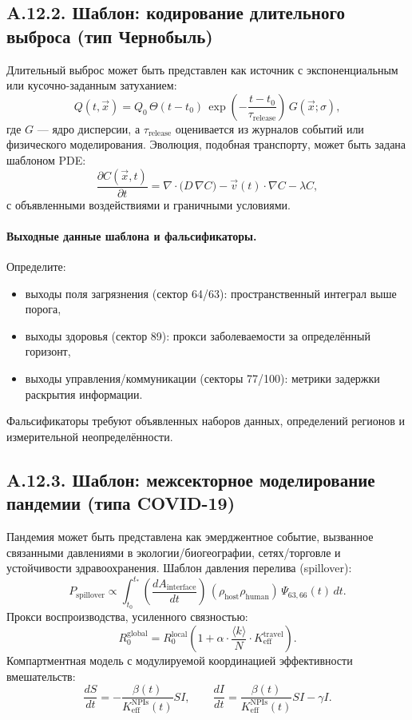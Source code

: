 \documentclass[11pt,a4paper]{article}
\begin{document}
	\subsection*{A.12.2. Шаблон: кодирование длительного выброса (тип Чернобыль)}
	
	Длительный выброс может быть представлен как источник с экспоненциальным или кусочно-заданным затуханием:
	$$
	Q(t,\vec{x}) = Q_0\,\Theta(t-t_0)\,\exp\!\left(-\frac{t-t_0}{\tau_{\mathrm{release}}}\right)\,G(\vec{x};\sigma),
	$$
	где $G$ — ядро дисперсии, а $\tau_{\mathrm{release}}$ оценивается из журналов событий или физического моделирования. Эволюция, подобная транспорту, может быть задана шаблоном PDE:
	$$
	\frac{\partial C(\vec{x},t)}{\partial t}
	= \nabla\cdot\big(D\,\nabla C\big) - \vec{v}(t)\cdot\nabla C - \lambda C,
	$$
	с объявленными воздействиями и граничными условиями.
	
	\paragraph{Выходные данные шаблона и фальсификаторы.}
	Определите:
	\begin{itemize}[leftmargin=*]
		\item выходы поля загрязнения (сектор 64/63): пространственный интеграл выше порога,
		\item выходы здоровья (сектор 89): прокси заболеваемости за определённый горизонт,
		\item выходы управления/коммуникации (секторы 77/100): метрики задержки раскрытия информации.
	\end{itemize}
	Фальсификаторы требуют объявленных наборов данных, определений регионов и измерительной неопределённости.
	
	\subsection*{A.12.3. Шаблон: межсекторное моделирование пандемии (типа COVID-19)}
	
	Пандемия может быть представлена как эмерджентное событие, вызванное связанными давлениями в экологии/биогеографии, сетях/торговле и устойчивости здравоохранения. Шаблон давления перелива (spillover):
	$$
	P_{\mathrm{spillover}} \propto \int_{t_0}^{t_{*}}
	\left(\frac{dA_{\mathrm{interface}}}{dt}\right)\,
	\left(\rho_{\mathrm{host}}\rho_{\mathrm{human}}\right)\,
	\Psi_{63,66}(t)\,dt.
	$$
	Прокси воспроизводства, усиленного связностью:
	$$
	R_0^{\mathrm{global}} = R_0^{\mathrm{local}}\left(1+\alpha\cdot \frac{\langle k\rangle}{N}\cdot K_{\mathrm{eff}}^{\mathrm{travel}}\right).
	$$
	Компартментная модель с модулируемой координацией эффективности вмешательств:
	$$
	\frac{dS}{dt} = - \frac{\beta(t)}{K_{\mathrm{eff}}^{\mathrm{NPIs}}(t)}SI,\qquad
	\frac{dI}{dt} = \frac{\beta(t)}{K_{\mathrm{eff}}^{\mathrm{NPIs}}(t)}SI - \gamma I.
	$$
	
\end{document}
